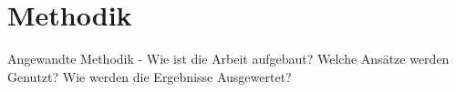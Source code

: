 \section{Methodik}
Angewandte Methodik - Wie ist die Arbeit aufgebaut? Welche Ansätze werden Genutzt? Wie werden die Ergebnisse Ausgewertet?
